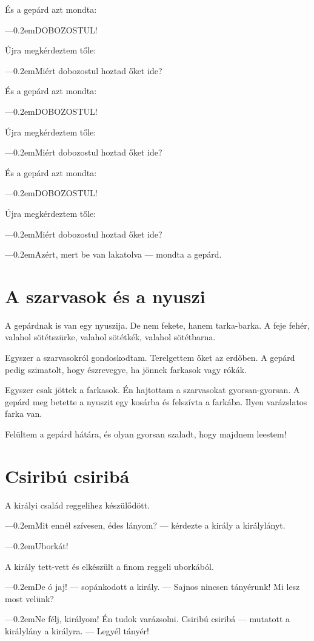 \documentclass[12pt]{memoir}
\def\dash{---\kern 0.2em}
\begin{document}
És a gepárd azt mondta:

\dash DOBOZOSTUL!

Újra megkérdeztem tőle:

\dash Miért dobozostul hoztad őket ide?

És a gepárd azt mondta:

\dash DOBOZOSTUL!

Újra megkérdeztem tőle:

\dash Miért dobozostul hoztad őket ide?

És a gepárd azt mondta:

\dash DOBOZOSTUL!

Újra megkérdeztem tőle:

\dash Miért dobozostul hoztad őket ide?

\dash Azért, mert be van lakatolva — mondta a gepárd.


\section{A szarvasok és a nyuszi}
A gepárdnak is van egy nyuszija. De nem fekete, hanem tarka-barka. A feje
fehér, valahol sötétszürke, valahol sötétkék, valahol sötétbarna.

Egyszer a szarvasokról gondoskodtam. Terelgettem őket az erdőben. A gepárd
pedig szimatolt, hogy észrevegye, ha jönnek farkasok vagy rókák.

Egyszer csak jöttek a farkasok. Én hajtottam a szarvasokat gyorsan-gyorsan. A
gepárd meg betette a nyuszit egy kosárba és felszívta a farkába. Ilyen
varázslatos farka van.

Felültem a gepárd hátára, és olyan gyorsan szaladt, hogy majdnem leestem!


\section{Csiribú csiribá}
A királyi család reggelihez készülődött.

\dash Mit ennél szívesen, édes lányom? — kérdezte a király a királylányt.

\dash Uborkát!

A király tett-vett és elkészült a finom reggeli uborkából.

\dash De ó jaj! — sopánkodott a király. — Sajnos nincsen tányérunk! Mi lesz most
velünk?

\dash Ne félj, királyom! Én tudok varázsolni. Csiribú csiribá — mutatott a
királylány a királyra. — Legyél tányér!
\end{document}
